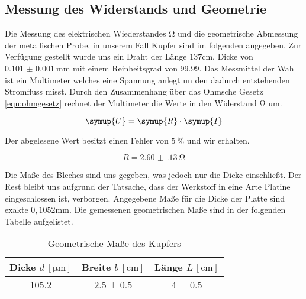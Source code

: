 \subsection{Messung des Widerstands und Geometrie}
\label{sec:aufgabe_a}
Die Messung des elektrischen Wiederstandes $\si{\ohm}$ und die geometrische Abmessung der metallischen Probe, in unserem Fall Kupfer sind im folgenden angegeben.
Zur Verfügung gestellt wurde uns ein Draht der Länge $137\si{\cm}$, Dicke von $\SI{0.101(1)}{\milli\meter}$ mit einem Reinheitsgrad von $99.99$. 
Das Messmittel der Wahl ist ein Multimeter welches eine Spannung anlegt un den dadurch entstehenden Stromfluss misst.
Durch den Zusammenhang über das Ohmsche Gesetz \eqref{eqn:ohmgesetz} rechnet der Multimeter die Werte in den Widerstand $\si{\ohm}$ um.

\begin{equation}
   \symup{U} = \symup{R} \cdot \symup{I}
\end{equation}

Der abgelesene Wert besitzt einen Fehler von $\SI{5}{\percent}$ und wir erhalten.

\begin{equation}
\label{eqn:ohmgesetz}
R = \SI{2.60(13)}{\ohm}
\end{equation}

Die Maße des Bleches sind uns gegeben, was jedoch nur die Dicke einschließt. %
Der Rest bleibt uns aufgrund der Tatsache, dass der Werkstoff in eine Arte Platine eingeschlossen ist, verborgen.
Angegebene Maße für die Dicke der Platte sind exakte $0,1052\si{\mm}$.
Die gemessenen geometrischen Maße sind in der folgenden Tabelle aufgelistet.

\begin{table}
  \centering
  \caption{Geometrische Maße des Kupfers}
  \label{tab:kupfergeo}
  \begin{tabular}{c c c}
    Dicke {$d \: [\si{\micro\meter}]$} & Breite $b \, [\si{\centi\meter}]$ & Länge $L \, [\si{\centi\meter}]$ \\
    \midrule
    105.2   & 2.5 ± 0.5 & 4 ± 0.5 \\
    \bottomrule
  \end{tabular}
\end{table}